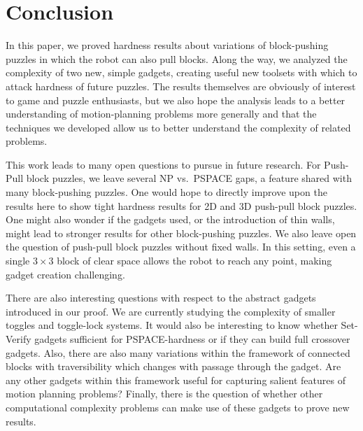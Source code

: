 \section{Conclusion}
In this paper, we proved hardness results about variations of block-pushing puzzles in which the robot can also pull blocks. Along the way, we analyzed the complexity of two new, simple gadgets, creating useful new toolsets with which to attack hardness of future puzzles. The results themselves are obviously of interest to game and puzzle enthusiasts, but we also hope the analysis leads to a better understanding of motion-planning problems more generally and that the techniques we developed allow us to better understand the complexity of related problems.

This work leads to many open questions to pursue in future research. For Push-Pull block puzzles, we leave several NP vs.\ PSPACE gaps, a feature shared with many block-pushing puzzles. One would hope to directly improve upon the results here to show tight hardness results for 2D and 3D push-pull block puzzles. One might also wonder if the gadgets used, or the introduction of thin walls, might lead to stronger results for other block-pushing puzzles. We also leave open the question of push-pull block puzzles without fixed walls. In this setting, even a single $3\times3$ block of clear space allows the robot to reach any point, making gadget creation challenging.

There are also interesting questions with respect to the abstract gadgets introduced in our proof. We are currently studying the complexity of smaller toggles and toggle-lock systems. It would also be interesting to know whether Set-Verify gadgets sufficient for PSPACE-hardness or if they can build full crossover gadgets. Also, there are also many variations within the framework of connected blocks with traversibility which changes with passage through the gadget. Are any other gadgets within this framework useful for capturing salient features of motion planning problems? Finally, there is the question of whether other computational complexity problems can make use of these gadgets to prove new results.
